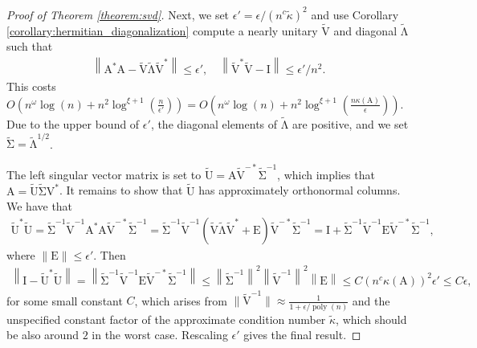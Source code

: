 \documentclass{article}
\newcommand{\lnorm}{\left\|}
\newcommand{\rnorm}{\right\|}
\newcommand{\lpar}{\left(}
\newcommand{\rpar}{\right)}
\DeclareMathOperator{\poly}{poly}
\newcommand\matA{\boldsymbol{\mathrm{A}}}
\newcommand\matE{\boldsymbol{\mathrm{E}}}
\newcommand\matI{\boldsymbol{\mathrm{I}}}
\newcommand\matV{\boldsymbol{\mathrm{V}}}
\newcommand\matUtilde{\widetilde{\boldsymbol{\mathrm{U}}}}
\newcommand\matVtilde{\widetilde{\boldsymbol{\mathrm{V}}}}
\newcommand\matLambdatilde{\widetilde{\boldsymbol{\mathrm{\Lambda}}}}
\newcommand\matSigmatilde{\widetilde{\boldsymbol{\mathrm{\Sigma}}}}
\newcommand{\cfmm}{\xi}
\begin{document}
\begin{proof}[Proof of Theorem \ref{theorem:svd}]
        Next, we set $\epsilon'=\epsilon/(n^c\widetilde\kappa)^2$ and use Corollary \ref{corollary:hermitian_diagonalization} 
        compute a nearly unitary $\matVtilde$ and diagonal $\matLambdatilde$ such that
        \begin{align*}
            \lnorm \matA^*\matA - \matVtilde\matLambdatilde\matVtilde^* \rnorm \leq \epsilon',
            \quad
            \lnorm \matVtilde^* \matVtilde - \matI \rnorm \leq \epsilon'/n^2.
        \end{align*}
        This costs $O\lpar 
        n^\omega\log(n) + n^2\log^{\cfmm+1}(\tfrac{n}{\epsilon'})
        \rpar
        =
        O\lpar 
            n^\omega\log(n) + n^2\log^{\cfmm+1}(\tfrac{n\kappa(\matA)}{\epsilon})
        \rpar
        $.
        Due to the upper bound of $\epsilon'$, the diagonal elements of $\matLambdatilde$ are positive, and we set $\matSigmatilde=\matLambdatilde^{1/2}$.

        The left singular vector matrix is set to
        $\matUtilde=\matA\matVtilde^{-*}\matSigmatilde^{-1}$, which implies that $\matA=\matUtilde\matSigmatilde\matV^*$.
        It remains to show that $\matUtilde$ has approximately orthonormal columns. We have that 
        \begin{align*}
            \matUtilde^*\matUtilde = \matSigmatilde^{-1}\matVtilde^{-1}\matA^*\matA\matVtilde^{-*}\matSigmatilde^{-1}
            = \matSigmatilde^{-1}\matVtilde^{-1}
                \lpar 
                    \matVtilde\matLambdatilde\matVtilde^* + \matE
                \rpar
            \matVtilde^{-*}\matSigmatilde^{-1}
            =
            \matI
            +
            \matSigmatilde^{-1}\matVtilde^{-1}\matE \matVtilde^{-*}\matSigmatilde^{-1},
        \end{align*}
        where $\|\matE\|\leq \epsilon'$. Then
        \begin{align*}
            \lnorm
                \matI-\matUtilde^*\matUtilde
            \rnorm
            =
            \lnorm
                \matSigmatilde^{-1}\matVtilde^{-1}\matE \matVtilde^{-*}\matSigmatilde^{-1}
            \rnorm
            \leq
            \lnorm
                \matSigmatilde^{-1}
            \rnorm^2
            \lnorm
                \matVtilde^{-1}
            \rnorm^2
            \lnorm
                \matE
            \rnorm
            \leq
            C(n^c\kappa(\matA))^2
            \epsilon'
            \leq
            C\epsilon,
        \end{align*}
        for some small constant $C$, which arises from $\|\matVtilde^{-1}\|\approx \tfrac{1}{1+\epsilon/\poly(n)}$ and the unspecified constant factor of the approximate condition number $\widetilde\kappa$, which should be also around $2$ in the worst case. Rescaling $\epsilon'$ gives the final result.


\end{proof}
\end{document}
